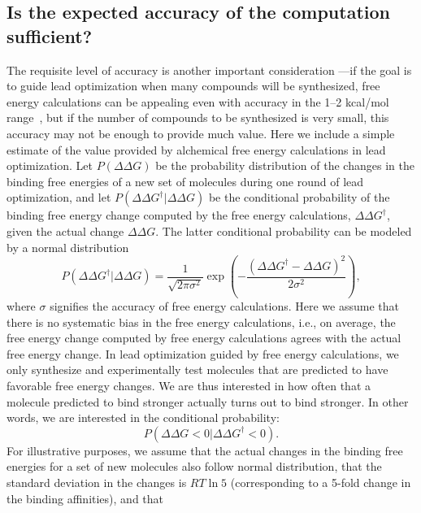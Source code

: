 \documentclass[9pt,bestpractices]{livecoms}
\begin{document}
\subsection{Is the expected accuracy of the computation sufficient?}
\label{subsec:accuracy}
The requisite level of accuracy is another important consideration ---if the
goal is to guide lead optimization when many compounds will be
synthesized, free energy calculations can be appealing even with
accuracy in the 1--2 kcal/mol range~\cite{mobley2012perspective}, but if the number of compounds to be synthesized is very small, this accuracy may not be enough to provide
much value.
%
Here we include a simple estimate of the value provided by alchemical
free energy calculations in lead optimization.  Let $P(\Delta\Delta
G)$ be the probability distribution of the changes in the binding free
energies of a new set of molecules during one round of lead
optimization, and let $P(\Delta\Delta G^\dagger|\Delta\Delta G)$ be the
conditional probability of the binding free energy change computed by
the free energy calculations, $\Delta\Delta G^\dagger$, given the actual
change $\Delta\Delta G$.  The latter conditional probability can be modeled
by a normal distribution
\begin{equation}
  P(\Delta\Delta G^\dagger|\Delta\Delta G) = \frac{1}{\sqrt{2\pi\sigma^2}}
  \exp\left(-\frac{(\Delta\Delta G^\dagger - \Delta\Delta G)^2}{2\sigma^2}\right),
  \label{eqn:free-energy-distribution}
\end{equation}
where $\sigma$ signifies the accuracy of free energy calculations.
Here we assume that there is no systematic bias in the free energy
calculations, i.e., on average, the free energy change computed by
free energy calculations agrees with the actual free energy change.
%
In lead optimization guided by free energy calculations, we only
synthesize and experimentally test molecules that are predicted to
have favorable free energy changes.  We are thus interested in how
often that a molecule predicted to bind stronger actually turns out to
bind stronger.  In other words, we are interested in the conditional
probability:
\begin{equation}
  P(\Delta\Delta G<0|\Delta\Delta G^\dagger<0).
  \label{eqn:true-positive}
\end{equation}
%
For illustrative purposes, we assume that the actual changes in the
binding free energies for a set of new molecules also follow normal
distribution, that the standard deviation in the changes is $RT\ln 5$
(corresponding to a 5-fold change in the binding affinities), and that
\end{document}
